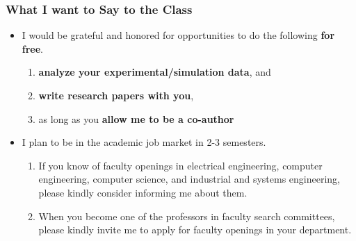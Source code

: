 \documentclass[xcolor={usenames,dvipsnames},hyperref={hyperindex,bookmarks}]{beamer}
\begin{document}
\frame
{
	\frametitle{What I want to Say to the Class}

	\begin{itemize}
	\item I would be grateful and honored for opportunities to do the following {\bf for free}.
		\begin{enumerate}
		\item {\bf analyze your experimental/simulation data}, and
		\item {\bf write research papers with you},
		\item as long as you {\bf allow me to be a co-author}
		\end{enumerate}
	\item I plan to be in the academic job market in 2-3 semesters. %
		\begin{enumerate} %
		\item If you know of faculty openings in electrical engineering, computer engineering, computer science, and industrial and systems engineering, please kindly consider informing me about them.
		\item When you become one of the professors in faculty search committees, please kindly invite me to apply for faculty openings in your department.
		\end{enumerate}
	\end{itemize}
}







%
%
%
%
%	
%	
\end{document}
